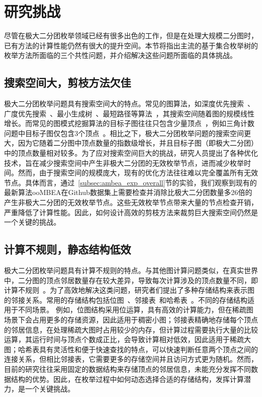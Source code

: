 
\section{研究挑战}

尽管在极大二分团枚举领域已经有很多出色的工作，但是在处理大规模二分图时，已有方法的计算性能仍然有很大的提升空间。本节将指出主流的基于集合枚举树的枚举方法所面临的三个共性问题，并介绍解决这些问题所面临的具体挑战。

\subsection{搜索空间大，剪枝方法欠佳}

极大二分团枚举问题具有搜索空间大的特点。常见的图算法，如深度优先搜索~\cite{wiki-dfs}、广度优先搜索~\cite{wiki-bfs}、最小生成树~\cite{wiki-mst}、最短路径等算法~\cite{wiki-sssp}，其搜索空间随着图的规模线性增长。而常见的图模式挖掘算法的目标子图往往只包含少量顶点~\cite{peregrine20,pangolin20,g2miner22,decomine22,khuzdul23,gamma23,Graphset23}，例如三角计数问题中目标子图仅包含3个顶点~\cite{triangle18}。相比之下，极大二分团枚举问题的搜索空间更大，因为它随着二分图中顶点数量的指数级增长，并且目标子图（即极大二分团）中的顶点数量相对较多。为了应对搜索空间巨大的挑战，研究人员提出了各种优化技术，旨在减少搜索空间中产生非极大二分团的无效枚举节点，进而减少枚举时间。然而，由于搜索空间的规模庞大，现有的优化方法往往难以完全覆盖所有无效节点。具体而言，通过~\ref{subsec:ambea_exp_overall}节的实验，我们观察到现有的最新算法ooMBEA在Github数据集上需要检查并消除比极大二分团数量多26倍的产生非极大二分团的无效枚举节点。这些无效枚举节点带来大量的节点检查开销，严重降低了计算性能。因此，如何设计高效的剪枝方法来裁剪巨大搜索空间仍然是一个关键的挑战。


\subsection{计算不规则，静态结构低效}

极大二分团枚举问题具有计算不规则的特点。与其他图计算问题类似，在真实世界中，二分图的顶点邻居数量存在较大差异，导致每次计算涉及的顶点数量不同，即计算不规则~\cite{Irregularity12}。为了高效地解决这类问题，研究者们提出了多种存储结构来表示图的邻接关系。常用的存储结构包括位图~\cite{lcm04,lcmmbc07,FCA15,FCA21,FCA22}、邻接表~\cite{iMBEA14,PMBE20,ooMBE22}和哈希表~\cite{parMBE19}。不同的存储结构适用于不同场景。
例如，位图结构采用位运算，具有高效的计算能力，但在稀疏图场景下会占用更多的存储资源，因此适用于稠密小图；邻接表精确地存储每个顶点的邻居信息，在处理稀疏大图时占用较少的内存，但计算过程需要执行大量的比较运算，其运行时间与顶点个数成正比，会导致计算相对低效，因此适用于稀疏大图；哈希表具有灵活性和便于快速查找的特点，可以快速判断任意两个顶点之间的连接关系，但相比邻接表，它需要更多的存储空间并且访问方式更为随机。然而，目前的研究往往采用固定的数据结构来存储顶点的邻居信息，未能充分发挥不同数据结构的优势。因此，在枚举过程中如何动态选择合适的存储结构，发挥计算潜力，是一个关键挑战。



